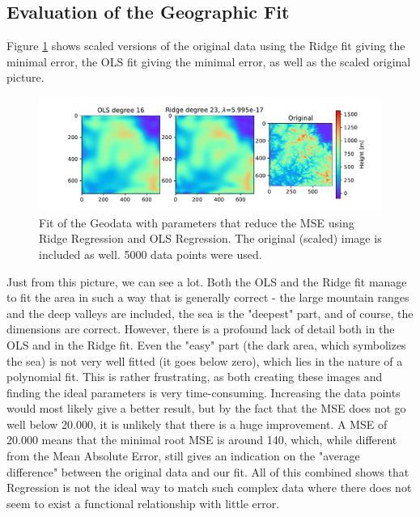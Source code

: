 \documentclass[11pt,a4paper,titlepage]{article}
\begin{document}
\subsection{Evaluation of the Geographic Fit}
Figure \ref{fig:Korea_plot} shows scaled versions of the original data using the Ridge fit giving the minimal error, the OLS fit giving the minimal error, as well as the scaled original picture.
\begin{figure}[H]
\centering
\includegraphics[width=1.0\textwidth]{Fitted_images.pdf}
\caption[Fitted Geodata]{Fit of the Geodata with parameters that reduce the MSE using Ridge Regression and OLS Regression. The original (scaled) image is included as well. 5000 data points were used.}
\label{fig:Korea_plot}
\end{figure}
Just from this picture, we can see a lot. Both the OLS and the Ridge fit manage to fit the area in such a way that is generally correct - the large mountain ranges and the deep valleys are included, the sea is the "deepest" part, and of course, the dimensions are correct. However, there is a profound lack of detail both in the OLS and in the Ridge fit. Even the "easy" part (the dark area, which symbolizes the sea) is not very well fitted (it goes below zero), which lies in the nature of a polynomial fit. This is rather frustrating, as both creating these images and finding the ideal parameters is very time-consuming. Increasing the data points would most likely give a better result, but by the fact that the MSE does not go well below 20.000, it is unlikely that there is a huge improvement. A MSE of 20.000 means that the minimal root MSE is around 140, which, while different from the Mean Absolute Error, still gives an indication on the "average difference" between the original data and our fit. All of this combined shows that Regression is not the ideal way to match such complex data where there does not seem to exist a functional relationship with little error. 
\end{document}
